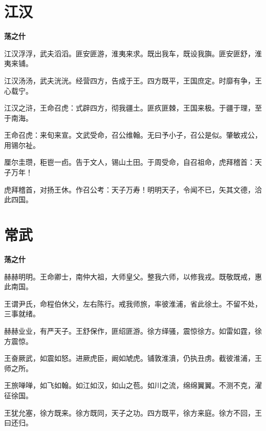 \documentclass[12pt,a4paper]{ctexbook}
\begin{document}
\section{江汉}
\textbf{荡之什}\par\vspace{0.5em}
江汉浮浮，武夫滔滔。匪安匪游，淮夷来求。既出我车，既设我旟。匪安匪舒，淮夷来铺。\par
江汉汤汤，武夫洸洸。经营四方，告成于王。四方既平，王国庶定。时靡有争，王心载宁。\par
江汉之浒，王命召虎：式辟四方，彻我疆土。匪疚匪棘，王国来极。于疆于理，至于南海。\par
王命召虎：来旬来宣。文武受命，召公维翰。无曰予小子，召公是似。肇敏戎公，用锡尔祉。\par
厘尔圭瓒，秬鬯一卣。告于文人，锡山土田。于周受命，自召祖命，虎拜稽首：天子万年！\par
虎拜稽首，对扬王休。作召公考：天子万寿！明明天子，令闻不已，矢其文德，洽此四国。\par

\section{常武}
\textbf{荡之什}\par\vspace{0.5em}
赫赫明明。王命卿士，南仲大祖，大师皇父。整我六师，以修我戎。既敬既戒，惠此南国。\par
王谓尹氏，命程伯休父，左右陈行。戒我师旅，率彼淮浦，省此徐土。不留不处，三事就绪。\par
赫赫业业，有严天子。王舒保作，匪绍匪游。徐方绎骚，震惊徐方。如雷如霆，徐方震惊。\par
王奋厥武，如震如怒。进厥虎臣，阚如虓虎。铺敦淮濆，仍执丑虏。截彼淮浦，王师之所。\par
王旅啴啴，如飞如翰。如江如汉，如山之苞。如川之流，绵绵翼翼。不测不克，濯征徐国。\par
王犹允塞，徐方既来。徐方既同，天子之功。四方既平，徐方来庭。徐方不回，王曰还归。\par
\end{document}
